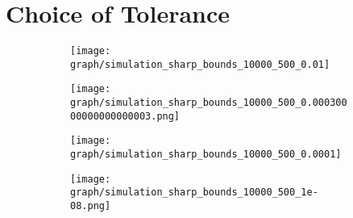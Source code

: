 \documentclass[11pt, a4paper, leqno]{article}
\begin{document}
\printbibliography

\appendix
\renewcommand\thefigure{\thesection.\arabic{figure}}

\setcounter{table}{0}
\renewcommand{\thetable}{A\arabic{table}}

\clearpage
\newpage

\section{Choice of Tolerance}

\begin{figure}[h!]
    \caption{Simulation Results by Choice of $\kappa_n$ \label{app_fig:tolerances}}
     \centering

     \begin{subfigure}[b]{0.49\textwidth}
         \centering
          \texttt{[image: graph/simulation\_sharp\_bounds\_10000\_500\_0.01]}
     \end{subfigure}
    \hfill
     \begin{subfigure}[b]{0.49\textwidth}
         \centering
          \texttt{[image: graph/simulation\_sharp\_bounds\_10000\_500\_0.00030000000000000003.png]}
        \end{subfigure}

     \begin{subfigure}[b]{0.49\textwidth}
         \centering
         \texttt{[image: graph/simulation\_sharp\_bounds\_10000\_500\_0.0001]}
     \end{subfigure}
    \hfill
     \begin{subfigure}[b]{0.49\textwidth}
         \centering
         \texttt{[image: graph/simulation\_sharp\_bounds\_10000\_500\_1e-08.png]}
     \end{subfigure}


\end{figure}
\clearpage
\newpage
\end{document}
